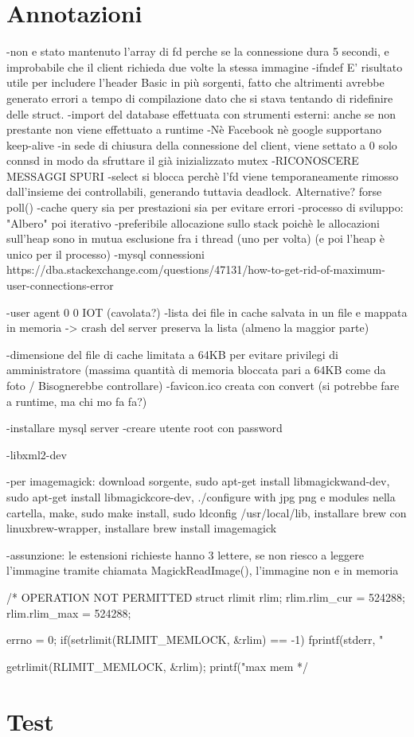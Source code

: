 \documentclass[paper=a4, oneside, fontsize=14pt, titlepage]{article}
\begin{document}
	\section{Annotazioni}
	\begin{flushleft}
		-non e stato mantenuto l'array di fd perche se la connessione dura 5 secondi, e improbabile che il client richieda due volte la stessa immagine
		-ifndef E' risultato utile per includere l'header Basic in più sorgenti, fatto che altrimenti avrebbe generato errori a tempo di compilazione dato che si stava tentando di ridefinire delle struct.\newline
		-import del database effettuata con strumenti esterni: anche se non prestante non viene effettuato a runtime
		-Nè Facebook nè google supportano keep-alive
		-in sede di chiusura della connessione del client, viene settato a 0 solo connsd in modo da sfruttare il già inizializzato mutex
		-RICONOSCERE MESSAGGI SPURI
		-select si blocca perchè l'fd viene temporaneamente rimosso dall'insieme dei controllabili, generando tuttavia deadlock. Alternative? forse poll()
		-cache query sia per prestazioni sia per evitare errori
		-processo di sviluppo: "Albero" poi iterativo
		-preferibile allocazione sullo stack poichè le allocazioni sull'heap sono in mutua esclusione fra i thread (uno per volta) (e poi l'heap è unico per il processo)
		-mysql connessioni https://dba.stackexchange.com/questions/47131/how-to-get-rid-of-maximum-user-connections-error
		
		-user agent 0 0 IOT (cavolata?)
		-lista dei file in cache salvata in un file e mappata in memoria -> crash del server preserva la lista (almeno la maggior parte)
		
		-dimensione del file di cache limitata a 64KB per evitare privilegi di amministratore (massima quantità di memoria bloccata pari a 64KB come da foto / Bisognerebbe controllare)
		-favicon.ico creata con convert (si potrebbe fare a runtime, ma chi mo fa fa?)
		
		-installare mysql server
		-creare utente root con password
		
		-libxml2-dev
		
		-per imagemagick: download sorgente, sudo apt-get install libmagickwand-dev, sudo apt-get install libmagickcore-dev, ./configure with jpg png e modules nella cartella, make, sudo make install, sudo ldconfig /usr/local/lib, installare brew con linuxbrew-wrapper, installare brew install imagemagick


		-assunzione: le estensioni richieste hanno 3 lettere, se non riesco a leggere l'immagine tramite chiamata MagickReadImage(), l'immagine non e in memoria

		/* OPERATION NOT PERMITTED
		struct rlimit rlim;
		rlim.rlim\_cur = 524288;
		rlim.rlim\_max = 524288;

		errno = 0;
		if(setrlimit(RLIMIT\_MEMLOCK, \&rlim) == -1)
		fprintf(stderr, "%

		getrlimit(RLIMIT\_MEMLOCK, \&rlim);
		printf("max mem %
		*/
	\end{flushleft}
	\section{Test}
	\begin{flushleft}
		
	\end{flushleft}
	
\end{document}
